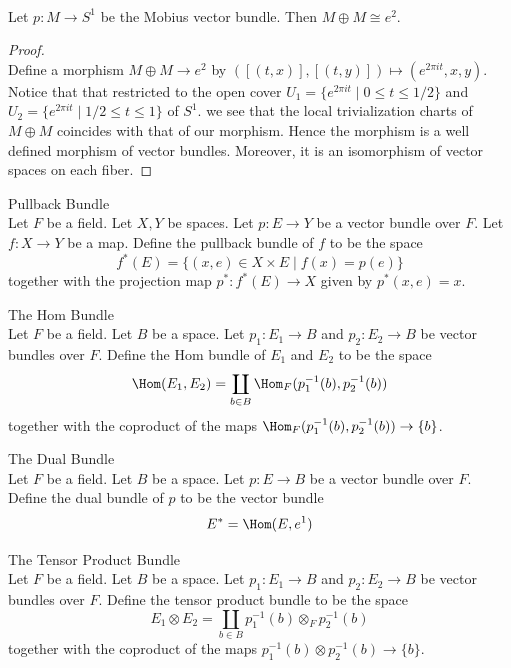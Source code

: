 \documentclass[a4paper]{article}
\begin{document}
\begin{eg}{}{}\\
Let $p:M\to S^1$ be the Mobius vector bundle. Then $M\oplus M\cong e^2$. 
\begin{proof}\\
Define a morphism $M\oplus M\to e^2$ by $([(t,x)],[(t,y)])\mapsto(e^{2\pi it},x,y)$. Notice that that restricted to the open cover $U_1=\{e^{2\pi it}\;|\;0\leq t\leq 1/2\}$ and $U_2=\{e^{2\pi it}\;|\;1/2\leq t\leq 1\}$ of $S^1$. we see that the local trivialization charts of $M\oplus M$ coincides with that of our morphism. Hence the morphism is a well defined morphism of vector bundles. Moreover, it is an isomorphism of vector spaces on each fiber. 
\end{proof}
\end{eg}

\begin{defn}{Pullback Bundle}{}\\
Let $F$ be a field. Let $X,Y$ be spaces. Let $p:E\to Y$ be a vector bundle over $F$. Let $f:X\to Y$ be a map. Define the pullback bundle of $f$ to be the space $$f^\ast(E)=\{(x,e)\in X\times E\;|\;f(x)=p(e)\}$$ together with the projection map $p^\ast:f^\ast(E)\to X$ given by $p^\ast(x,e)=x$. 
\end{defn}

\begin{defn}{The Hom Bundle}{}\\
Let $F$ be a field. Let $B$ be a space. Let $p_1:E_1\to B$ and $p_2:E_2\to B$ be vector bundles over $F$. Define the Hom bundle of $E_1$ and $E_2$ to be the space $$\Hom(E_1,E_2)=\coprod_{b\in B}\Hom_F(p_1^{-1}(b),p_2^{-1}(b))$$ together with the coproduct of the maps $\Hom_F(p_1^{-1}(b),p_2^{-1}(b))\to\{b\}$. 
\end{defn}

\begin{defn}{The Dual Bundle}{}\\
Let $F$ be a field. Let $B$ be a space. Let $p:E\to B$ be a vector bundle over $F$. Define the dual bundle of $p$ to be the vector bundle $$E^\ast=\Hom(E,e^1)$$
\end{defn}

\begin{defn}{The Tensor Product Bundle}{}\\
Let $F$ be a field. Let $B$ be a space. Let $p_1:E_1\to B$ and $p_2:E_2\to B$ be vector bundles over $F$. Define the tensor product bundle to be the space $$E_1\otimes E_2=\coprod_{b\in B}p_1^{-1}(b)\otimes_F p_2^{-1}(b)$$ together with the coproduct of the maps $p_1^{-1}(b)\otimes p_2^{-1}(b)\to\{b\}$. 
\end{defn}
\end{document}
